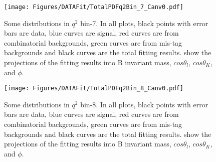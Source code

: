 \begin{figure}
  \centering
  \texttt{[image: Figures/DATAFit/TotalPDFq2Bin\_7\_Canv0.pdf]}
  \caption{Some distributions in $q^2$ bin-7.
    In all plots, black points with error bars are data, blue curves are signal, red curves are from combinatorial backgrounds, green curves are from mis-tag backgrounds and black curves are the total fitting results.
    show the projections of the fitting results into B invariant mass, $cos\theta_l$, $cos\theta_K$, and $\phi$.}
  \label{fig:res_bin7}
\end{figure}

\begin{figure}
  \centering
  \texttt{[image: Figures/DATAFit/TotalPDFq2Bin\_8\_Canv0.pdf]}
  \caption{Some distributions in $q^2$ bin-8.
    In all plots, black points with error bars are data, blue curves are signal, red curves are from combinatorial backgrounds, green curves are from mis-tag backgrounds and black curves are the total fitting results.
    show the projections of the fitting results into B invariant mass, $cos\theta_l$, $cos\theta_K$, and $\phi$.}
  \label{fig:res_bin8}
\end{figure}
